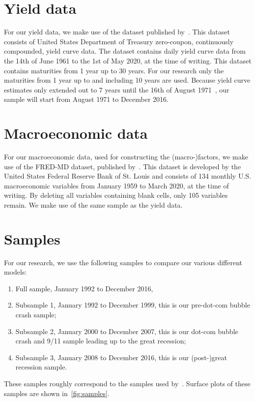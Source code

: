 \section{Yield data}
For our yield data, we make use of the dataset published by~\textcite{gurkaynak_us_2007}. 
This dataset consists of United States Department of Treasury zero-coupon, continuously compounded, yield curve data. 
The dataset contains daily yield curve data from the 14th of June 1961 to the 1st of May 2020, at the time of writing. 
This dataset contains maturities from 1 year up to 30 years. 
For our research only the maturities from 1 year up to and including 10 years are used. 
Because yield curve estimates only extended out to 7 years until the 16th of August 1971~\parencite[see][p.~19]{gurkaynak_us_2007}, our sample will start from August 1971 to December 2016. 

\section{Macroeconomic data}
For our macroeconomic data, used for constructing the (macro-)factors, we make use of the FRED-MD dataset, published by~\textcite{mccracken_fred-md_2016}. 
This dataset is developed by the United States Federal Reserve Bank of St. Louis and consists of 134 monthly U.S. macroeconomic variables from January 1959 to March 2020, at the time of writing. 
By deleting all variables containing blank cells, only 105 variables remain. 
We make use of the same sample as the yield data.

\section{Samples}
\label{sec:samples}
For our research, we use the following samples to compare our various different models:
\begin{enumerate}
	\item Full sample, January 1992 to December 2016,
	\item Subsample 1, January 1992 to December 1999, this is our pre-dot-com bubble crash sample;
	\item Subsample 2, January 2000 to December 2007, this is our dot-com bubble crash and 9/11 sample leading up to the great recession;
	\item Subsample 3, January 2008 to December 2016, this is our (post-)great recession sample.
\end{enumerate}
These samples roughly correspond to the samples used by~\textcite{swanson_big_2017}. 
Surface plots of these samples are shown in~\cref{fig:samples}. 

